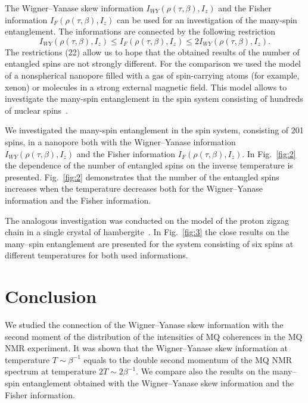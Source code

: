 \documentclass[preprint,12pt]{elsarticle}
\begin{document}
The Wigner--Yanase skew information $I_{WY}(\rho(\tau,\beta),I_z)$ and the Fisher information $I_F(\rho(\tau,\beta),I_z)$ can be used for an investigation of the many-spin entanglement.
The informations are connected by the following restriction~\cite{3}
%
\begin{equation} \label{eq:22}
    I_{WY}\left(\rho(\tau,\beta), I_z\right)
    \leq I_F\left(\rho(\tau,\beta), I_z\right)
    \leq 2I_{WY}\left(\rho(\tau,\beta), I_z\right).
\end{equation}
%
The restrictions (22) allow us to hope that the obtained results of the number of entangled spins are not strongly different.
For the comparison we used the model~\cite{23} of a nonspherical nanopore filled with a gas of spin-carrying atoms (for example, xenon) or molecules in a strong external magnetic field.
This model allows to investigate the many-spin entanglement in the spin system consisting of hundreds of nuclear spins~\cite{8}.


We investigated the many-spin entanglement in the spin system, consisting of 201 spins, in a nanopore both with
the Wigner--Yanase information $I_{WY}\left(\rho(\tau, \beta), I_z\right)$
and the Fisher information $I_F\left(\rho(\tau,\beta),I_z\right)$.
In Fig.~\ref{fig:2} the dependence of the number of entangled spins on the inverse temperature is presented.
Fig.~\ref{fig:2} demonstrates that the number of the entangled spins increases when the temperature decreases both for the Wigner--Yanase information and the Fisher information.


The analogous investigation was conducted on the model of the proton zigzag chain in a single crystal of hambergite~\cite{16,24}.
In Fig.~\ref{fig:3} the close results on the many--spin entanglement are presented for the system consisting of six spins at different temperatures for both used informations.


\section{Conclusion}
\label{sec:5}

We studied the connection of the Wigner--Yanase skew information with the second moment of the distribution of the intensities of MQ coherences in the MQ NMR experiment.
It was shown that the Wigner--Yanase skew information at temperature $T \sim \beta^{-1}$ equals to the double second momentum of the MQ NMR spectrum at temperature $2T \sim 2\beta^{-1}$.
We compare also the results on the many--spin entanglement obtained with the Wigner--Yanase skew information and the Fisher information.
\end{document}
